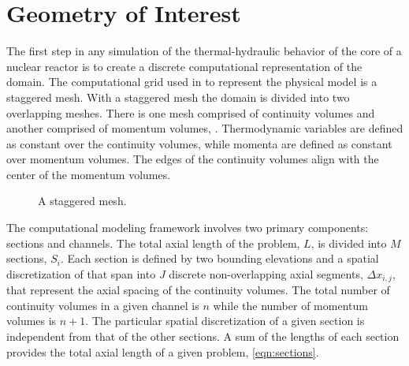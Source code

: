 \section{Geometry of Interest}
\label{sect:topology}
The first step in any simulation of the thermal-hydraulic behavior of the core of a nuclear reactor is to create a discrete computational representation of the domain.
The computational grid used in \cobra{} to represent the physical model is a staggered mesh.
With a staggered mesh the domain is divided into two overlapping meshes.
There is one mesh comprised of continuity volumes and another comprised of momentum volumes, .
Thermodynamic variables are defined as constant over the continuity volumes, while momenta are defined as constant over momentum volumes.
The edges of the continuity volumes align with the center of the momentum volumes.

\begin{figure}[ht]
\begin{center}
\end{center}
\caption{A staggered mesh.}
\label{fig:staggered_mesh}
\end{figure}

The computational modeling framework involves two primary components: sections and channels.
The total axial length of the problem, $L$, is divided into $M$ sections, $S_i$.
Each section is defined by two bounding elevations and a spatial discretization of that span into $J$ discrete non-overlapping axial segments, $\Delta x_{i,j}$, that represent the axial spacing of the continuity volumes.
The total number of continuity volumes in a given channel is $n$ while the number of momentum volumes is $n+1$.
The particular spatial discretization of a given section is independent from that of the other sections.
A sum of the lengths of each section provides the total axial length of a given problem, \eqref{eqn:sections}.

